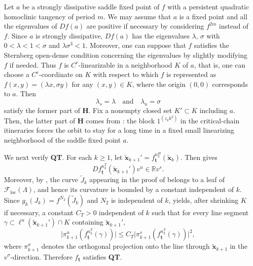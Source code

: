 \documentclass{amsart}
\theoremstyle{plain}
\theoremstyle{definition}
\theoremstyle{remark}
\numberwithin{equation}{section}
\begin{document}
Let $a$ be a strongly dissipative saddle fixed point of $f$ with a persistent quadratic homoclinic tangency of 
period $m$.
We may assume that $a$ is a fixed point and all the eigenvalues of $Df(a)$ are positive if necessary by considering  
$f^{2m}$ instead of $f$.
Since $a$ is strongly dissipative, $Df(a)$ has the eigenvalues 
$\lambda$, $\sigma$ with $0<\lambda<1<\sigma$ and $\lambda\sigma^3<1$.
Moreover, one can suppose that $f$ satisfies the Sternberg open-dense condition \cite{st} concerning the eigenvalues by slightly modifying $f$ if needed.
Thus $f$ is $C^r$-linearizable in a neighborhood $K$ of $a$, that is, 
one can choose a $C^r$-coordinate on $K$ with respect to which $f$ is represented as $f(x,y)=(\lambda x,\sigma y)$ for any $(x,y)\in K$, where the origin $(0,0)$ corresponds to $a$. 
Then \[\lambda_{s}=\lambda\quad
\text{and}\quad \lambda_{u}=\sigma\]
satisfy the former part of {\bf H}.
Fix a nonempty closed set $K' \subset K$ including $a$.
Then, the latter part of {\bf H} comes from \cite[Section 7]{KS2017}: the block $1^{(z_k k^2)}$ in the critical-chain itineraries forces the orbit to stay for a long time in a fixed small linearizing neighborhood of the saddle fixed point $a$.

We next verify {\bf QT}. For each $k\ge1$, let
$
\widetilde{\boldsymbol{x}}_{k+1}'
=
f_{\underline{\boldsymbol{t}}}^{n_k^H}(\widetilde{\boldsymbol{x}}_k).
$
Then \cite[Lemma~8.2]{KS2017} gives
\[
Df_{\underline{\boldsymbol{t}}}^{n_k^T}(\widetilde{\boldsymbol{x}}_{k+1}')v^u\in \mathbb R v^s.
\]
Moreover, by \cite[Remark~7.7]{KS2017}, the curve $\widetilde J_k$ appearing in the proof of \cite[Lemma~8.2]{KS2017} belongs to a leaf of $\mathcal F_{\mathrm{loc}}(\Lambda)$, and hence its curvature is bounded by a constant independent of $k$.
Since $g_k(J_k)=f^{N_2}(\widetilde J_k)$ and $N_2$ is independent of $k$, \cite[Lemma~8.1(2)]{KS2017} yields, after shrinking $K$ if necessary, a constant $C_{T}>0$ independent of $k$ such that for every line segment
$
\gamma\subset \ell^u(\widetilde{\boldsymbol{x}}_{k+1}')\cap K
$
containing $\widetilde{\boldsymbol{x}}_{k+1}'$,
\[
\bigl|\pi^u_{k+1}(f_{\underline{\boldsymbol{t}}}^{n_k^T}(\gamma))\bigr|
\le
C_{T}
\bigl|\pi^s_{k+1}(f_{\underline{\boldsymbol{t}}}^{n_k^T}(\gamma))\bigr|^2,
\]
where $\pi^\sigma_{k+1}$ denotes the orthogonal projection onto the line through $\widetilde{\boldsymbol{x}}_{k+1}$ in the $v^\sigma$-direction.
Therefore $f_{\underline{\boldsymbol{t}}}$ satisfies {\bf QT}.
\end{document}
